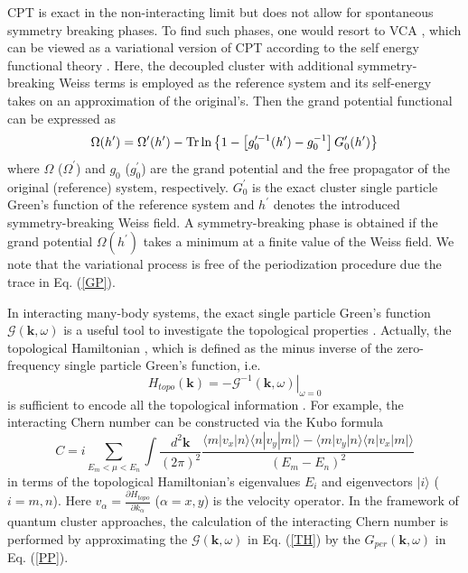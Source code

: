 \documentclass[12pt]{iopart}
\begin{document}
\par CPT is exact in the non-interacting limit but does not allow for spontaneous symmetry breaking phases. To find such phases, one would resort to VCA \cite{PAD_PRL2003}, which can be viewed as a variational version of CPT according to the self energy functional theory \cite{P_EPJB2003}. Here, the decoupled cluster with additional symmetry-breaking Weiss terms is employed as the reference system and its self-energy takes on an approximation of the original's. Then the grand potential functional can be expressed as
\begin{equation}\label{GP}
\Omega(h^\prime)=\Omega^\prime(h^\prime)-\mathop{\mathrm{Tr}}\nolimits\ln\left\{1-\left[g_0^{\prime-1}(h^\prime)-g_0^{-1}\right]G^\prime_0(h^\prime)\right\}
\end{equation}
where $\Omega$ ($\Omega^\prime$) and $g_0$ ($g_0^\prime$) are the grand potential and the free propagator of the original (reference) system, respectively. $G^\prime_0$ is the exact cluster single particle Green's function of the reference system and $h^\prime$ denotes the introduced symmetry-breaking Weiss field. A symmetry-breaking phase is obtained if the grand potential $\Omega(h^\prime)$ takes a minimum at a finite value of the Weiss field. We note that the variational process is free of the periodization procedure due the trace in Eq. (\ref{GP}).

\par In interacting many-body systems, the exact single particle Green's function $\mathcal{G}(\mathbf{k},\omega)$ is a useful tool to investigate the topological properties \cite{V2003,G_PRB2011,WZ_PRX2012}. Actually, the topological Hamiltonian \cite{WY_JPCM2013}, which is defined as the minus inverse of the zero-frequency single particle Green's function, i.e.
\begin{equation}\label{TH}
H_{topo}(\mathbf{k})=\left.-\mathcal{G}^{-1}(\mathbf{k},\omega)\right|_{\omega=0}
\end{equation}
is sufficient to encode all the topological information \cite{WZ_PRX2012}. For example, the interacting Chern number can be constructed via the Kubo formula \cite{TKNN_PRL1982}
\begin{equation}\label{KF}
C=i\sum_{E_m<\mu<E_n} \int\frac{d^2\mathbf{k}}{(2\pi)^2} \frac{\langle m|v_x|n\rangle\langle n|v_y|m|\rangle-\langle m|v_y|n\rangle\langle n|v_x|m|\rangle}{(E_m-E_n)^2}
\end{equation}
in terms of the topological Hamiltonian's eigenvalues $E_i$ and eigenvectors $|i\rangle$ ($i=m,n$). Here $v_\alpha=\frac{\partial H_{topo}}{\partial k_\alpha}$ ($\alpha=x,y$) is the velocity operator. In the framework of quantum cluster approaches, the calculation of the interacting Chern number is performed by approximating the $\mathcal{G}(\mathbf{k},\omega)$ in Eq. (\ref{TH}) by the $G_{per}(\mathbf{k},\omega)$ in Eq. (\ref{PP}).
\end{document}
